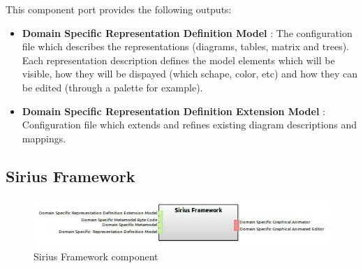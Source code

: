 \documentclass{gemoc} %
\begin{document}
This component port provides the following outputs:
\begin{itemize}
  \item \textbf{Domain Specific  Representation Definition Model} :
The configuration file which describes the representations (diagrams, tables, matrix and trees). Each representation description defines the model elements which will be visible, how they will be dispayed (which schape, color, etc) and how they can be edited (through a palette for example).
  \item \textbf{Domain Specific Representation Definition Extension Model} :
Configuration file which extends and refines existing diagram descriptions and mappings.
\end{itemize}

\subsection{Sirius Framework}

\begin{figure}[htp]
	\begin{center}
	\includegraphics*[trim=0.0cm 0.0cm 0cm 0.0cm, clip=true, scale=1.0]{../images/generated/Generated_Sirius Framework.jpg}
	\caption{Sirius Framework component}
	\end{center}
\end{figure}
\end{document}
